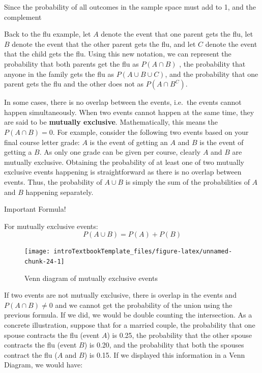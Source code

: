 \documentclass[
]{book}
\theoremstyle{definition}
\theoremstyle{definition}
\theoremstyle{definition}
\theoremstyle{remark}
\begin{document}
Since the probability of all outcomes in the sample space must add to 1, and the complement

Back to the flu example, let \(A\) denote the event that one parent gets the flu, let \(B\) denote the event that the other parent gets the flu, and let \(C\) denote the event that the child gets the flu. Using this new notation, we can represent the probability that both parents get the flu as \(P(A \cap B)\) , the probability that anyone in the family gets the flu as \(P(A \cup B \cup C)\), and the probability that one parent gets the flu and the other does not as \(P(A \cap B^C)\).

In some cases, there is no overlap between the events, i.e.~the events cannot happen simultaneously. When two events cannot happen at the same time, they are said to be \textbf{mutually exclusive}. Mathematically, this means the \(P(A \cap B) = 0\). For example, consider the following two events based on your final course letter grade: \(A\) is the event of getting an \(A\) and \(B\) is the event of getting a \(B\). As only one grade can be given per course, clearly \(A\) and \(B\) are mutually exclusive. Obtaining the probability of at least one of two mutually exclusive events happening is straightforward as there is no overlap between events. Thus, the probability of \(A \cup B\) is simply the sum of the probabilities of \(A\) and \(B\) happening separately.

Important Formula!

For mutually exclusive events:
\[P(A \cup B) = P(A) + P(B)\]

\begin{figure}

{\centering \texttt{[image: introTextbookTemplate\_files/figure-latex/unnamed-chunk-24-1]} 

}

\caption{Venn diagram of mutually exclusive events}\label{fig:unnamed-chunk-24}
\end{figure}

If two events are not mutually exclusive, there is overlap in the events and \(P(A \cap B) \neq 0\) and we cannot get the probability of the union using the previous formula. If we did, we would be double counting the intersection. As a concrete illustration, suppose that for a married couple, the probability that one spouse contracts the flu (event \(A\)) is 0.25, the probability that the other spouse contracts the flu (event \(B\)) is 0.20, and the probability that both the spouses contract the flu (\(A\) and \(B\)) is 0.15. If we displayed this information in a Venn Diagram, we would have:
\end{document}
